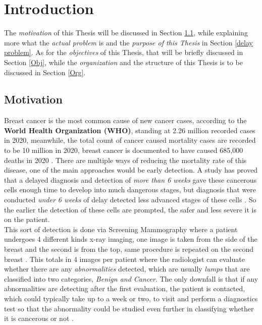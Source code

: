 \documentclass[12pt]{extarticle}
\begin{document}
	
	\newpage
	\large{}
	\section{Introduction}
	The \emph{motivation} of this Thesis will be discussed in Section \ref{Motiv}, while explaining more what the \emph{actual problem} is and the \emph{purpose of this Thesis} in Section \ref{delay problem}. As for the \emph{objectives} of this Thesis, that will be briefly discussed in Section \ref{Obj}, while the \emph{organization} and the structure of this Thesis is to be discussed in Section \ref{Org}.
	\subsection{Motivation}\label{Motiv}
	
	Breast cancer is the most common cause of new cancer cases, according to the \textbf{World Health Organization (WHO)}, standing at 2.26 million recorded cases in 2020, meanwhile, the total count of cancer caused mortality cases are recorded to be 10 million in 2020, breast cancer is documented to have caused 685,000 deaths in 2020 \cite{WHO_stats}. There are multiple ways of reducing the mortality rate of this disease, one of the main approaches would be early detection. A study has proved that a delayed diagnosis and detection of \emph{more than 6 weeks} gave these cancerous cells enough time to develop into much dangerous stages, but diagnosis that were conducted \emph{under 6 weeks} of delay detected less advanced stages of these cells \cite{caplan2014delay}. So the earlier the detection of these cells are prompted, the safer and less severe it is on the patient.
	\\[5mm]
	This sort of detection is done via Screening Mammography where a patient undergoes 4 different kinds x-ray imaging, one image is taken from the side of the breast and the second is from the top, same procedure is repeated on the second breast \cite{healthline}. This totals in 4 images per patient where the radiologist can evaluate whether there are any \emph{abnormalities} detected, which are usually \emph{lumps} that are classified into two categories, \emph{Benign and Cancer}. The only downfall is that if any abnormalities are detecting after the first evaluation, the patient is contacted, which could typically take up to a week or two, to visit and perform a diagnostics test so that the abnormality could be studied even further in classifying whether it is cancerous or not \cite{healthline}.\\[5mm]
	
\end{document}
